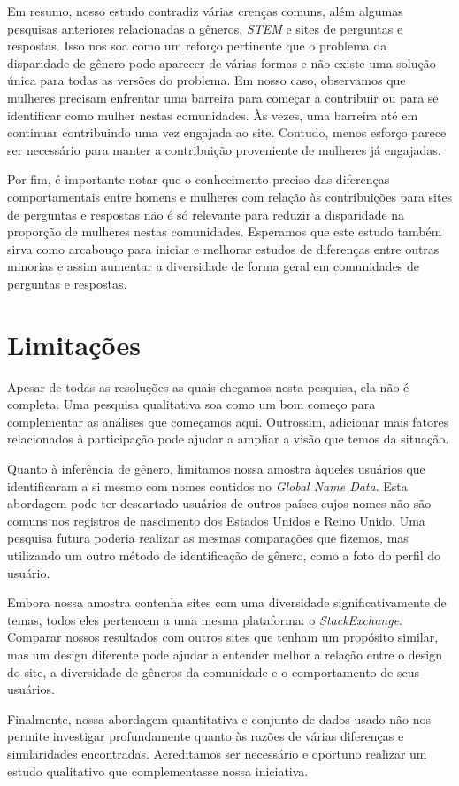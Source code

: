Em resumo, nosso estudo contradiz várias crenças comuns, além algumas pesquisas anteriores relacionadas a gêneros, \emph{STEM} e sites de perguntas e respostas. Isso nos soa como um reforço pertinente que o problema da disparidade de gênero pode aparecer de várias formas e não existe uma solução única para todas as versões do problema. Em nosso caso, observamos que mulheres precisam enfrentar uma barreira para começar a contribuir ou para se identificar como mulher nestas comunidades. Às vezes, uma barreira até em continuar contribuindo uma vez engajada ao site. Contudo, menos esforço parece ser necessário para manter a contribuição proveniente de mulheres já engajadas.

Por fim, é importante notar que o conhecimento preciso das diferenças comportamentais entre homens e mulheres com relação às contribuições para sites de perguntas e respostas não é só relevante para reduzir a disparidade na proporção de mulheres nestas comunidades. Esperamos que este estudo também sirva como arcabouço para iniciar e melhorar estudos de diferenças entre outras minorias e assim aumentar a diversidade de forma geral em comunidades de perguntas e respostas.

\section{Limitações}
\label{ch:limites}
Apesar de todas as resoluções as quais chegamos nesta pesquisa, ela não é completa. Uma pesquisa qualitativa soa como um bom começo para complementar as análises que começamos aqui. Outrossim, adicionar mais fatores relacionados à participação pode ajudar a ampliar a visão que temos da situação.

Quanto à inferência de gênero, limitamos nossa amostra àqueles usuários que identificaram a si mesmo com nomes contidos no \emph{Global Name Data}. Esta abordagem pode ter descartado usuários de outros países cujos nomes não são comuns nos registros de nascimento dos Estados Unidos e Reino Unido. Uma pesquisa futura poderia realizar as mesmas comparações que fizemos, mas utilizando um outro método de identificação de gênero, como a foto do perfil do usuário.

Embora nossa amostra contenha sites com uma diversidade significativamente de temas, todos eles pertencem a uma mesma plataforma: o \emph{StackExchange}. Comparar nossos resultados com outros sites que tenham um propósito similar, mas um design diferente pode ajudar a entender melhor a relação entre o design do site, a diversidade de gêneros da comunidade e o comportamento de seus usuários.

Finalmente, nossa abordagem quantitativa e conjunto de dados usado não nos permite investigar profundamente quanto às razões de várias diferenças e similaridades encontradas. Acreditamos ser necessário e oportuno realizar um estudo qualitativo que complementasse nossa iniciativa.